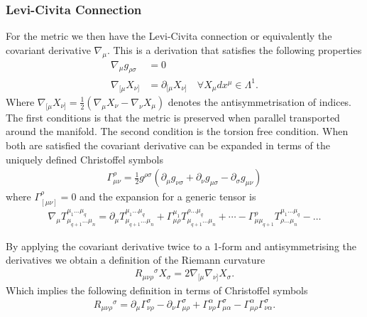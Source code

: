 \documentclass[10pt]{report}
\theoremstyle{definition}
\begin{document}
\subsubsection{Levi-Civita Connection}
For the metric we then have the Levi-Civita connection or equivalently the covariant derivative $\nabla_\mu$. This is a derivation that satisfies the following properties
\begin{align}
    \nabla_\mu g_{\rho\sigma} & = 0 \\
    \nabla_{[\mu} X_{\nu]} & = \partial_{[\mu} X_{\nu]} \quad \forall X_{\mu} dx^\mu \in \Lambda^1.
\end{align}
Where $\nabla_{[\mu} X_{\nu]} = \frac{1}{2} \left( \nabla_{\mu} X_{\nu} -\nabla_{\nu} X_{\mu} \right)$ denotes the antisymmetrisation of indices. The first conditions is that the metric is preserved when parallel transported around the manifold. The second condition is the torsion free condition. When both are satisfied the covariant derivative can be expanded in terms of the uniquely defined Christoffel symbols
\begin{align}
    \Gamma^\rho_{\mu\nu} = \frac{1}{2} g^{\rho\sigma} \left( \partial_\mu g_{\nu\sigma} + \partial_\nu g_{\mu\sigma} - \partial_\sigma g_{\mu\nu} \right)
\end{align}
where $\Gamma^\rho_{[\mu\nu]} = 0$ and the expansion for a generic tensor is
\begin{align}
    \nabla_\mu T^{\mu_1\ldots\mu_q}_{\mu_{q+1}\ldots\mu_{n}} = \partial_\mu T^{\mu_1\ldots\mu_q}_{\mu_{q+1}\ldots\mu_{n}} + \Gamma^{\mu_1}_{\mu\rho} T^{\rho\ldots\mu_q}_{\mu_{q+1}\ldots\mu_{n}} + \cdots - \Gamma^{\rho}_{\mu\mu_{q+1}} T^{\mu_1\ldots\mu_q}_{\rho\ldots\mu_{n}} - \ldots
\end{align}

By applying the covariant derivative twice to a 1-form and antisymmetrising the derivatives we obtain a definition of the Riemann curvature 
\begin{align}
    R_{\mu\nu\rho}{}^\sigma X_\sigma = 2 \nabla_{[\mu} \nabla_{\nu]} X_\sigma.
\end{align}
Which implies the following definition in terms of Christoffel symbols 
\begin{align}
    R_{\mu\nu\rho}{}^\sigma = \partial_\mu \Gamma^\sigma_{\nu\rho} - \partial_\nu \Gamma^{\sigma}_{\mu\rho} + \Gamma^\alpha_{\nu\rho} \Gamma^\sigma_{\mu\alpha} -  \Gamma^\alpha_{\mu\rho} \Gamma^\sigma_{\nu\alpha}. \label{eq:metric-Riemann-curvature-tensor-definition}
\end{align}
\end{document}
